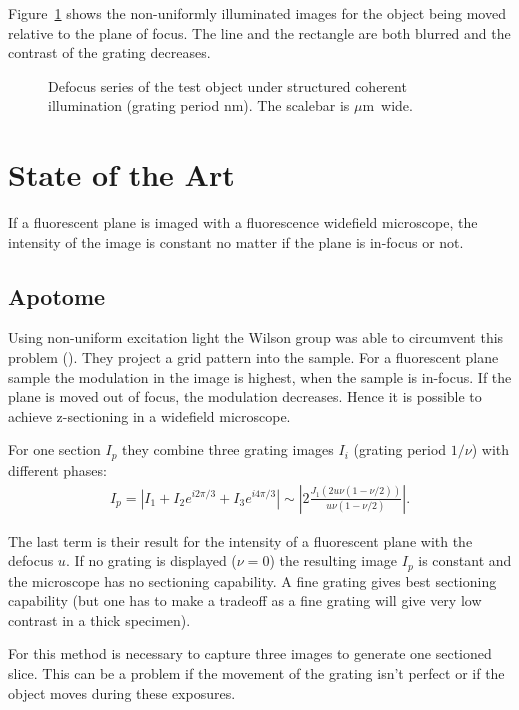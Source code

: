 \documentclass[11pt]{scrartcl}
\newcommand{\abs}[1]{\left| #1 \right|}
\newcommand{\figref}[1]{Figure~\ref{#1}}
\begin{document}
\figref{fig:defocus} shows the non-uniformly illuminated images for
the object being moved relative to the plane of focus. The line and
the rectangle are both blurred and the contrast of the grating
decreases.
\begin{figure}[htb]
  \centering
  \subfigure[100 nm defocus]{\texttt{[image: in100]}}
  \subfigure[200 nm]{\texttt{[image: in200]}}
  \subfigure[500 nm]{\texttt{[image: in500]}}
  \caption{Defocus series of the test object under structured coherent
    illumination (grating period \unit[600]{nm}). The scalebar is
    \unit[2]{$\mu$m} wide.}
  \label{fig:defocus}
\end{figure}


\section{State of the Art}
If a fluorescent plane is imaged with a fluorescence widefield
microscope, the intensity of the image is constant no matter if the
plane is in-focus or not. 
\subsection{Apotome}
Using non-uniform excitation light the Wilson group was able to
circumvent this problem (\cite{1997Neil}). They project a grid pattern
into the sample. For a fluorescent plane sample the modulation in the
image is highest, when the sample is in-focus. If the plane is moved
out of focus, the modulation decreases. Hence it is possible to achieve
z-sectioning in a widefield microscope.

For one section $I_p$ they combine three grating images $I_i$ (grating
period $1/\nu$) with different phases:
\begin{align}
  I_p=\abs{I_1+I_2e^{i2\pi/3}+I_3e^{i4\pi/3}}
  \sim\abs{ 2 \frac{J_1(2u\nu(1-\nu/2))}{u\nu(1-\nu/2)}}.
\end{align}

The last term is their result for the intensity of a fluorescent plane
with the defocus $u$. If no grating is displayed ($\nu=0$) the
resulting image $I_p$ is constant and the microscope has no sectioning
capability. A fine grating gives best sectioning capability (but one
has to make a tradeoff as a fine grating will give very low contrast
in a thick specimen).

For this method is necessary to capture three images to generate one
sectioned slice. This can be a problem if the movement of the grating
isn't perfect or if the object moves during these exposures.
\end{document}
